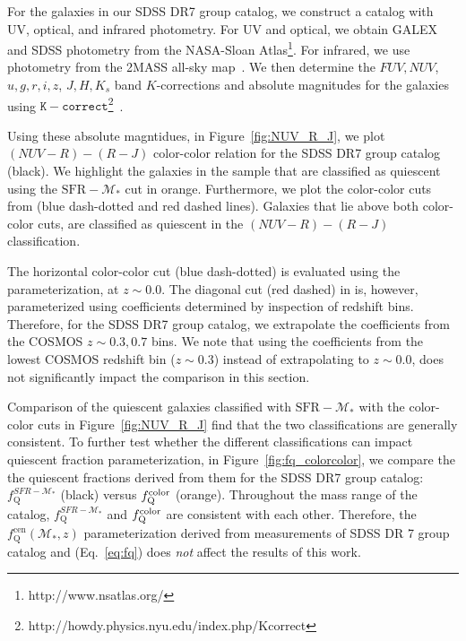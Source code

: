 \documentclass[iop,apj,tighten,twocolappendix,numberedappendix]{emulateapj}
\newcommand{\fq}{f_\mathrm{Q}}
\newcommand{\fqcen}{f_\mathrm{Q}^\mathrm{cen}}
\begin{document}
For the galaxies in our SDSS DR7 group catalog, we construct a catalog
with UV, optical, and infrared photometry. For UV and optical, 
we obtain GALEX and SDSS photometry from the NASA-Sloan Atlas\footnote{http://www.nsatlas.org/}.
For infrared, we use photometry from the 2MASS all-sky map~\citep{Cutri:2000aa}. 
We then determine the $FUV, NUV$, $u, g, r, i, z$, $J, H, K_s$ 
band $K$-corrections and absolute magnitudes for the galaxies 
using $\mathtt{K-correct}$\footnote{http://howdy.physics.nyu.edu/index.php/Kcorrect}~\citep[v4.2][]{Blanton:2007aa}. 

Using these absolute magntidues, in Figure~\ref{fig:NUV_R_J}, we 
plot $(NUV-R) - (R-J)$ color-color relation for the SDSS DR7 group 
catalog (black). We highlight the galaxies in the sample that are 
classified as quiescent using the $\mathrm{SFR} - \mathcal{M}_*$
cut in orange. Furthermore, we plot the color-color cuts from 
\cite{Bundy:2010aa} (blue dash-dotted and red dashed lines). 
Galaxies that lie above both color-color cuts, are classified as 
quiescent in the $(NUV-R) - (R-J)$ classification. 

The horizontal color-color cut (blue dash-dotted) is evaluated
using the \cite{Bundy:2010aa} parameterization, at $z \sim 0.0$. The 
diagonal cut (red dashed) in \cite{Bundy:2010aa} is, however, 
parameterized using coefficients determined by inspection of 
redshift bins. Therefore, for the SDSS DR7 group catalog, we 
extrapolate the coefficients from the COSMOS $z \sim 0.3, 0.7$ 
bins. We note that using the coefficients from the lowest COSMOS 
redshift bin ($z \sim 0.3$) instead of extrapolating to $z \sim 0.0$,
does not significantly impact the comparison in this section. 

Comparison of the quiescent galaxies classified with $\mathrm{SFR} - \mathcal{M}_*$ 
with the color-color cuts in Figure~\ref{fig:NUV_R_J} find that
the two classifications are generally consistent. To further 
test whether the different classifications can impact quiescent
fraction parameterization, in Figure~\ref{fig:fq_colorcolor}, we 
compare the the quiescent fractions derived from them for the 
SDSS DR7 group catalog: $\fq^{SFR-\mathcal{M}_*}$ (black) versus 
$\fq^{\rm color}$ (orange). Throughout the mass range of the 
catalog, $\fq^{SFR-\mathcal{M}_*}$ and $\fq^{\rm color}$ are 
consistent with each other. Therefore, the $\fqcen(\mathcal{M}_*, z)$ 
parameterization derived from measurements of SDSS DR 7 group catalog 
and \cite{Tinker:2013aa} (Eq.~\ref{eq:fq}) does {\em not} affect the 
results of this work.
\end{document}

